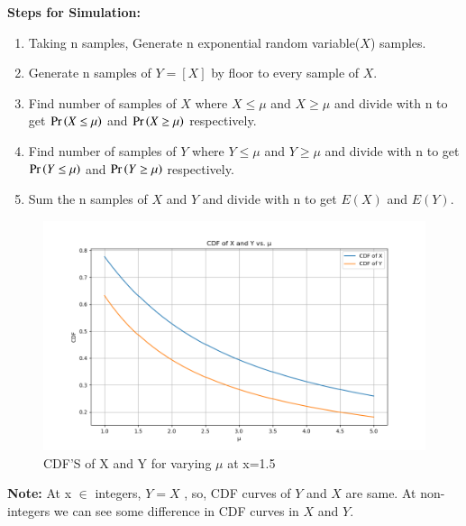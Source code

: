 \documentclass[journal,12pt,twocolumn]{IEEEtran}
\theoremstyle{remark}
\begin{document}
\textbf{Steps for Simulation:}
\begin{enumerate}
\item Taking n samples, Generate n exponential random variable($X$) samples.
\item Generate n samples of $Y=[X]$ by floor to every sample of $X$.
\item Find number of samples of $X$ where $X \leq \mu$ and $X \geq \mu$ and divide with n to get $\Pr\left(X \leq \mu\right)$ and $\Pr\left(X \geq \mu\right)$ respectively.
\item Find number of samples of $Y$ where $Y \leq \mu$ and $Y \geq \mu$ and divide with n to get $\Pr\left(Y \leq \mu\right)$ and $\Pr\left(Y \geq \mu\right)$ respectively.
\item Sum the n samples of $X$ and $Y$ and divide with n to get $E(X)$ and $E(Y)$.
\end{enumerate}
\begin{figure}[!ht]
\centering
\includegraphics[width=\columnwidth]{figs/figure.png}
\caption{CDF'S of X and Y for varying $\mu$ at x=1.5}
\end{figure}
\textbf{Note:}
At x $\in$ integers, $Y=X$ , so, CDF curves of $Y$ and $X$ are same. At non-integers we can see some difference in CDF curves in $X$ and $Y$. 
\end{document}
